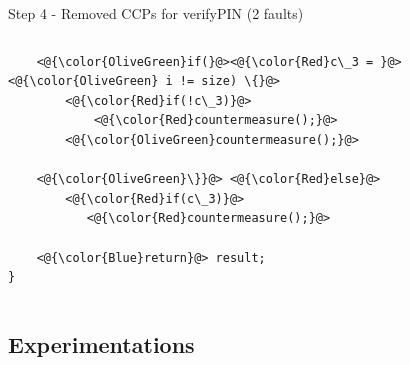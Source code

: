\begin{frame}[fragile]{Step 4 - Removed CCPs for verifyPIN (2 faults)}
\begin{columns}
\begin{column}{0.5\textwidth}
\begin{lstlisting}
    <@{\color{OliveGreen}if(}@><@{\color{Red}c\_3 = }@><@{\color{OliveGreen} i != size) \{}@>
        <@{\color{Red}if(!c\_3)}@>
            <@{\color{Red}countermeasure();}@>
        <@{\color{OliveGreen}countermeasure();}@>
    
    <@{\color{OliveGreen}\}}@> <@{\color{Red}else}@>
        <@{\color{Red}if(c\_3)}@>
           <@{\color{Red}countermeasure();}@>

    <@{\color{Blue}return}@> result;
}
            \end{lstlisting}
    	\vfill
        \end{column}
    \end{columns}
\end{frame}

\subsection{Experimentations}

